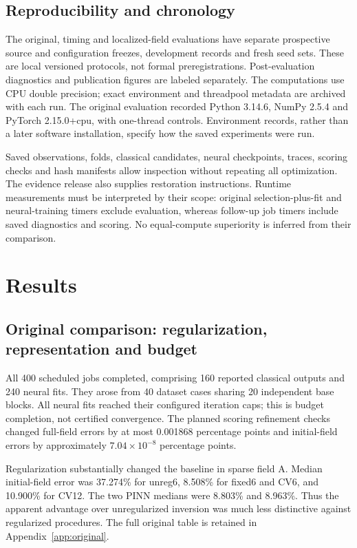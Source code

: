 \documentclass[11pt,a4paper]{article}
\begin{document}
\subsection{Reproducibility and chronology}
The original, timing and localized-field evaluations have separate prospective source and configuration freezes, development records and fresh seed sets. These are local versioned protocols, not formal preregistrations. Post-evaluation diagnostics and publication figures are labeled separately. The computations use CPU double precision; exact environment and threadpool metadata are archived with each run. The original evaluation recorded Python 3.14.6, NumPy 2.5.4 and PyTorch 2.15.0+cpu, with one-thread controls. Environment records, rather than a later software installation, specify how the saved experiments were run.

Saved observations, folds, classical candidates, neural checkpoints, traces, scoring checks and hash manifests allow inspection without repeating all optimization. The evidence release also supplies restoration instructions. Runtime measurements must be interpreted by their scope: original selection-plus-fit and neural-training timers exclude evaluation, whereas follow-up job timers include saved diagnostics and scoring. No equal-compute superiority is inferred from their comparison.

\section{Results}
\subsection{Original comparison: regularization, representation and budget}
All 400 scheduled jobs completed, comprising 160 reported classical outputs and 240 neural fits. They arose from 40 dataset cases sharing 20 independent base blocks. All neural fits reached their configured iteration caps; this is budget completion, not certified convergence. The planned scoring refinement checks changed full-field errors by at most 0.001868 percentage points and initial-field errors by approximately $7.04\times10^{-8}$ percentage points.

Regularization substantially changed the baseline in sparse field A. Median initial-field error was 37.274\% for unreg6, 8.508\% for fixed6 and CV6, and 10.900\% for CV12. The two PINN medians were 8.803\% and 8.963\%. Thus the apparent advantage over unregularized inversion was much less distinctive against regularized procedures. The full original table is retained in Appendix~\ref{app:original}.
\end{document}
